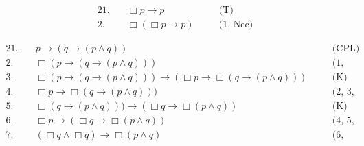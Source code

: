 \begin{solution}
  \begin{sollist}
    
    \item 
    \begin{alignat*}{2}
      1.\quad& \Box p \to p &\quad& \text{(T)}\\
      2.\quad& \Box(\Box p \to p) &\quad& \text{(1, Nec)}
    \end{alignat*}
    
    \item 
    \begin{alignat*}{2}
      1.\quad& p \to (q \to (p \land q)) &\quad& \text{(CPL)}\\
      2.\quad& \Box (p \to (q \to (p \land q))) &\quad& \text{(1, Nec)}\\
      3.\quad& \Box (p \to (q \to (p \land q))) \to (\Box p \to \Box (q \to (p \land q))) &\quad& \text{(K)}\\
      4.\quad& \Box p \to \Box (q \to (p \land q))) &\quad& \text{(2, 3, CPL)}\\
      5.\quad& \Box (q \to (p \land q))) \to (\Box q \to \Box (p\land q))  &\quad& \text{(K)}\\
      6.\quad& \Box p \to (\Box q \to \Box (p\land q))  &\quad& \text{(4, 5, CPL)}\\
      7.\quad& (\Box q \land \Box q) \to \Box (p\land q)  &\quad& \text{(6, CPL)}
    \end{alignat*}


\end{sollist}
\end{solution}
